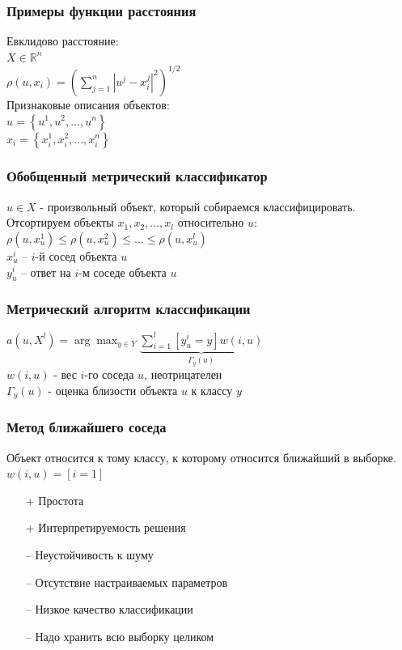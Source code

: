 \documentclass[12pt]{beamer}
\begin{document}
\begin{frame}\frametitle{Примеры функции расстояния}
Евклидово расстояние:\\
${X \in \mathbb{R}^{n}}$\\
\vspace{5mm}
${\rho (u, x_i) = (\sum\limits_{j=1}^n |u^j - x_i^j|^2)^{1/2}}$\\
\vspace{10mm}
Признаковые описания объектов:\\
${u = \left\{ u^1, u^2, ..., u^n \right\}}$ \\
${x_i = \left\{x_i^1, x_i^2, ..., x_i^n \right\} }$ 
\end{frame}

\begin{frame}\frametitle{Обобщенный метрический классификатор}
$u \in X$ - произвольный объект, который собираемся классифицировать.\\
\vspace{5mm}
Отсортируем объекты $x_1, x_2, ..., x_l$ относительно $u$:
${\rho(u, x_u^1) \leq \rho(u, x_u^2) \leq \dots \leq \rho(u, x_u^l)}$\\
\vspace{5mm}
${x_u^i}$ -- $i$-й сосед объекта $u$\\
${y_u^i}$ -- ответ на $i$-м соседе объекта $u$
 
\end{frame}

\begin{frame}\frametitle{Метрический алгоритм классификации}
${a(u, X^l) = \arg\max_{y \in Y} \underbrace{\sum\limits_{i=1}^l [y_u^i = y]w(i, u)}_{\Gamma_y(u)} }$\\
\vspace{5mm}
$w(i, u)$ - вес $i$-го соседа $u$, неотрицателен\\
$\Gamma_y(u)$ - оценка близости объекта $u$ к классу ${y}$
\end{frame}

\begin{frame}\frametitle{Метод ближайшего соседа}
Объект относится к тому классу, к которому относится ближайший в выборке.\\
${w(i, u) = [i=1]}$\\
\vspace{5mm}
\begin{itemize}
	\item[+] Простота
	\item[+] Интерпретируемость решения
\end{itemize}
\vspace{5mm}
\begin{itemize}
	\item[--	] Неустойчивость к шуму
	\item[--	] Отсутствие настраиваемых параметров
	\item[--	] Низкое качество классификации
	\item[--	] Надо хранить всю выборку целиком		
\end{itemize}
\end{frame}
\end{document}
